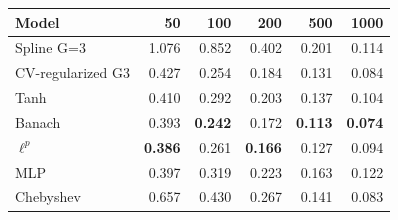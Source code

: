 \begin{tabular}{lrrrrr}
\toprule
Model & 50 & 100 & 200 & 500 & 1000 \\
\midrule
Spline G=3 & 1.076 & 0.852 & 0.402 & 0.201 & 0.114 \\
CV-regularized G3 & 0.427 & 0.254 & 0.184 & 0.131 & 0.084 \\
Tanh & 0.410 & 0.292 & 0.203 & 0.137 & 0.104 \\
Banach & 0.393 & \textbf{0.242} & 0.172 & \textbf{0.113} & \textbf{0.074} \\
$\ell^p$ & \textbf{0.386} & 0.261 & \textbf{0.166} & 0.127 & 0.094 \\
MLP & 0.397 & 0.319 & 0.223 & 0.163 & 0.122 \\
Chebyshev & 0.657 & 0.430 & 0.267 & 0.141 & 0.083 \\
\bottomrule
\end{tabular}
